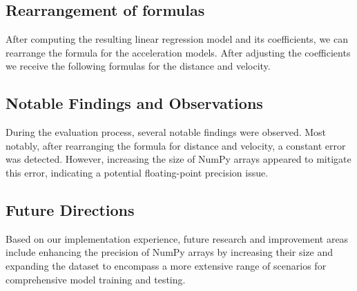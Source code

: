 \subsection{Rearrangement of formulas} 
After computing the resulting linear regression model and its coefficients, we can rearrange the formula 
for the acceleration models. 
After adjusting the coefficients we receive the following formulas for the distance and velocity.


\subsection{Notable Findings and Observations} 
During the evaluation process, several notable findings were observed. 
Most notably, after rearranging the formula for distance and velocity, a constant error was detected. 
However, increasing the size of NumPy arrays appeared to mitigate this error, indicating a potential 
floating-point precision issue.

\subsection{Future Directions} 
Based on our implementation experience, future research and improvement areas include enhancing the 
precision of NumPy arrays by increasing their size and expanding the dataset to encompass a more extensive
range of scenarios for comprehensive model training and testing.

